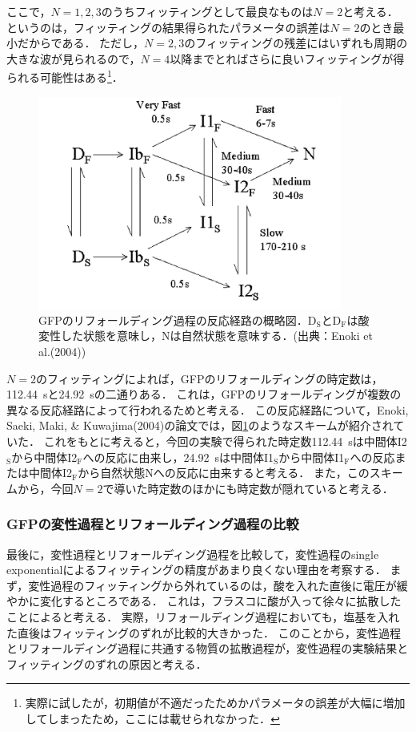 \documentclass[a4paper,11pt, titlepage]{jsarticle}
\begin{document}
ここで，$N=1,2,3$のうちフィッティングとして最良なものは$N=2$と考える．
というのは，フィッティングの結果得られたパラメータの誤差は$N=2$のとき最小だからである．
ただし，$N=2,3$のフィッティングの残差にはいずれも周期の大きな波が見られるので，$N=4$以降までとればさらに良いフィッティングが得られる可能性はある\footnote{実際に試したが，初期値が不適だったためかパラメータの誤差が大幅に増加してしまったため，ここには載せられなかった．}．

\begin{figure}[htbp]
    \centering
    \includegraphics[width=10cm]{ref_pathway.png}
    \caption{GFPのリフォールディング過程の反応経路の概略図．D$_\mathrm{S}$とD$_\mathrm{F}$は酸変性した状態を意味し，Nは自然状態を意味する．(出典：Enoki et al.(2004)\cite{refolding})}
    \label{fig:ref_path}
\end{figure}

$N=2$のフィッティングによれば，GFPのリフォールディングの時定数は，\SI{112.44}{\second}と\SI{24.92}{\second}の二通りある．
これは，GFPのリフォールディングが複数の異なる反応経路によって行われるためと考える．
この反応経路について，Enoki, Saeki, Maki, \& Kuwajima(2004)の論文\cite{refolding}では，図\ref{fig:ref_path}のようなスキームが紹介されていた．
これをもとに考えると，今回の実験で得られた時定数\SI{112.44}{\second}は中間体I2$_\mathrm{S}$から中間体I2$_\mathrm{F}$への反応に由来し，\SI{24.92}{\second}は中間体I1$_\mathrm{S}$から中間体I1$_\mathrm{F}$への反応または中間体I2$_\mathrm{F}$から自然状態Nへの反応に由来すると考える．
また，このスキームから，今回$N=2$で導いた時定数のほかにも時定数が隠れていると考える．

\subsubsection{GFPの変性過程とリフォールディング過程の比較}

最後に，変性過程とリフォールディング過程を比較して，変性過程のsingle exponentialによるフィッティングの精度があまり良くない理由を考察する．
まず，変性過程のフィッティングから外れているのは，酸を入れた直後に電圧が緩やかに変化するところである．
これは，フラスコに酸が入って徐々に拡散したことによると考える．
実際，リフォールディング過程においても，塩基を入れた直後はフィッティングのずれが比較的大きかった．
このことから，変性過程とリフォールディング過程に共通する物質の拡散過程が，変性過程の実験結果とフィッティングのずれの原因と考える．
\end{document}
